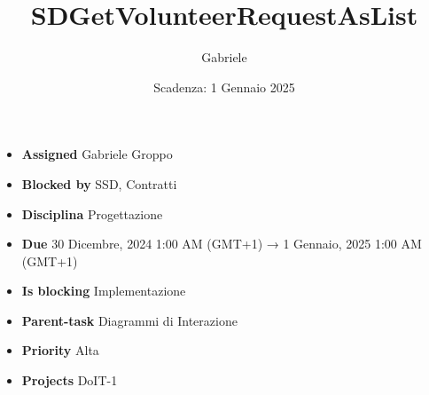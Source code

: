 \title{SDGetVolunteerRequestAsList}
\author{Gabriele}
\date{Scadenza: 1 Gennaio 2025}

\maketitle

\begin{itemize}
    \item \textbf{Assigned} Gabriele Groppo
    \item \textbf{Blocked by} SSD, Contratti
    \item \textbf{Disciplina} Progettazione
    \item \textbf{Due} 30 Dicembre, 2024 1:00 AM (GMT+1) → 1 Gennaio, 2025 1:00 AM (GMT+1)
    \item \textbf{Is blocking} Implementazione
    \item \textbf{Parent-task} Diagrammi di Interazione
    \item \textbf{Priority} Alta
    \item \textbf{Projects} DoIT-1
\end{itemize}